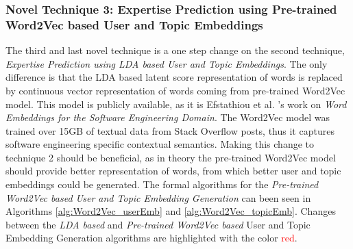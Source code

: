         \subsubsection{Novel Technique 3: Expertise Prediction using Pre-trained Word2Vec based User and Topic Embeddings}
        
            The third and last novel technique is a one step change on the second technique, \emph{Expertise Prediction using LDA based User and Topic Embeddings}. The only difference is that the LDA based latent score representation of words is replaced by continuous vector representation of words coming from pre-trained Word2Vec model. This model is publicly available, as it is Efstathiou et al. \cite{efstathiou2018word}'s work on \emph{Word Embeddings for the Software Engineering Domain}. The Word2Vec model \cite{mikolov2013efficient} was trained over 15GB of textual data from Stack Overflow posts, thus it captures software engineering specific contextual semantics. Making this change to technique 2 should be beneficial, as in theory the pre-trained Word2Vec model should provide better representation of words, from which better user and topic embeddings could be generated. The formal algorithms for the \emph{Pre-trained Word2Vec based User and Topic Embedding Generation} can been seen in Algorithms \ref{alg:Word2Vec_userEmb} and \ref{alg:Word2Vec_topicEmb}. Changes between the \emph{LDA based} and \emph{Pre-trained Word2Vec based} User and Topic Embedding Generation algorithms are highlighted with the color \textcolor{red}{red}. 
        
